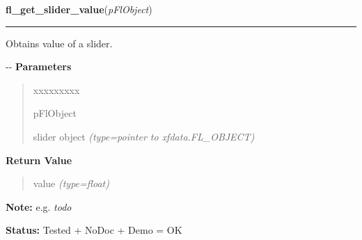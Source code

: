     \label{xformslib:flslider:fl_get_slider_value}

    \vspace{0.5ex}

\hspace{.8\funcindent}\begin{boxedminipage}{\funcwidth}

    \raggedright \textbf{fl\_get\_slider\_value}(\textit{pFlObject})

    \vspace{-1.5ex}

    \rule{\textwidth}{0.5\fboxrule}
\setlength{\parskip}{2ex}

Obtains value of a slider.

-{}-
\setlength{\parskip}{1ex}
      \textbf{Parameters}
      \vspace{-1ex}

      \begin{quote}
        \begin{Ventry}{xxxxxxxxx}

          \item[pFlObject]


slider object
            {\it (type=pointer to xfdata.FL\_OBJECT)}

        \end{Ventry}

      \end{quote}

      \textbf{Return Value}
    \vspace{-1ex}

      \begin{quote}

value
      {\it (type=float)}

      \end{quote}

\textbf{Note:} 
e.g. \emph{todo}


\textbf{Status:} 
Tested + NoDoc + Demo = OK


    \end{boxedminipage}

    \label{xformslib:flslider:fl_set_slider_bounds}

    \vspace{0.5ex}

